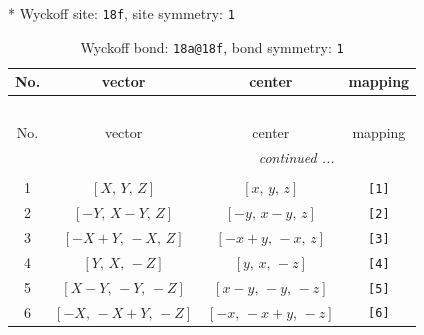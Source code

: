 \documentclass[fleqn,8pt]{jsarticle}
\begin{document}
* Wyckoff site: {\tt 18f}, site symmetry: {\tt 1}
\renewcommand{\arraystretch}{1.2}
\begin{longtable}{cccc}
\caption{Wyckoff bond: {\tt 18a@18f}, bond symmetry: {\tt 1}}
 \\
 \hline \hline
No. & vector & center & mapping \\ \hline \endfirsthead

\multicolumn{3}{l}{\tablename\ \thetable{}} \\
 \hline \hline
No. & vector & center & mapping \\ \hline \endhead

 \hline \hline
\multicolumn{3}{r}{\footnotesize\it continued ...} \\ \endfoot

 \hline \hline
\multicolumn{3}{r}{} \\ \endlastfoot

1 & $\left[ X,\, Y,\, Z \right]$ & $\left[ x,\, y,\, z \right]$ & {\tt [1]} \\ \hline
2 & $\left[ - Y,\, X - Y,\, Z \right]$ & $\left[ - y,\, x - y,\, z \right]$ & {\tt [2]} \\ \hline
3 & $\left[ - X + Y,\, - X,\, Z \right]$ & $\left[ - x + y,\, - x,\, z \right]$ & {\tt [3]} \\ \hline
4 & $\left[ Y,\, X,\, - Z \right]$ & $\left[ y,\, x,\, - z \right]$ & {\tt [4]} \\ \hline
5 & $\left[ X - Y,\, - Y,\, - Z \right]$ & $\left[ x - y,\, - y,\, - z \right]$ & {\tt [5]} \\ \hline
6 & $\left[ - X,\, - X + Y,\, - Z \right]$ & $\left[ - x,\, - x + y,\, - z \right]$ & {\tt [6]} \\
\end{longtable}
\end{document}
